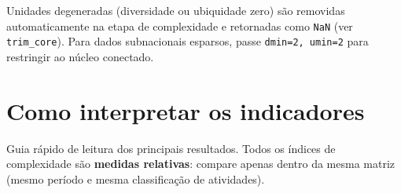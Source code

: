 \documentclass[12pt, a4paper]{article}
\newcommand{\fn}[1]{\texttt{#1}}
\begin{document}
\begin{notebox}
  Unidades degeneradas (diversidade ou ubiquidade zero) s\~{a}o removidas
  automaticamente na etapa de complexidade e retornadas como
  \texttt{NaN} (ver \fn{trim\_core}). Para dados subnacionais esparsos,
  passe \texttt{dmin=2, umin=2} para restringir ao n\'{u}cleo conectado.
\end{notebox}

\section{Como interpretar os indicadores}

Guia r\'{a}pido de leitura dos principais resultados. Todos os
\'{i}ndices de complexidade s\~{a}o \textbf{medidas relativas}: compare
apenas dentro da mesma matriz (mesmo per\'{i}odo e mesma
classifica\c{c}\~{a}o de atividades).
\end{document}
